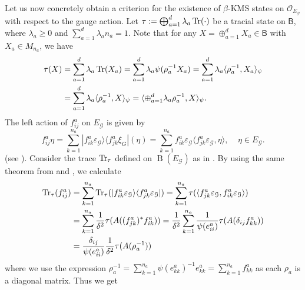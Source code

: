 \documentclass[a4paper,reqno]{amsart}
\numberwithin{equation}{section}
\newtheorem{theorem}{Theorem}
\numberwithin{theorem}{section}
\theoremstyle{definition}\newtheorem{definition}[theorem]{Definition}
\theoremstyle{definition}\newtheorem{remark}[theorem]{Remark}
\theoremstyle{definition}\newtheorem{example}[theorem]{Example}
\theoremstyle{definition}\newtheorem*{notation*}{Notation}
\theoremstyle{definition}\newtheorem*{convention*}{Convention}
\theoremstyle{definition}\newtheorem{observation}{Observation}
\theoremstyle{definition}\newtheorem*{acknowledgment*}{Acknowledgments}
\newcommand{\R}{\mathbb{R}}
\newcommand{\B}{\mathsf{B}}
\newcommand{\G}{\mathcal{G}}
\newcommand{\cst}{C^*}
\renewcommand{\op}[1]{\operatorname{#1}}
\begin{document}



Let us now concretely obtain a criterion for the existence of $\beta$-KMS states on $\mathcal{O}_{E_\G}$ with respect to the gauge action.
Let $\tau:=\bigoplus_{a=1}^d\lambda_a\Tr(\cdot)$ be a tracial state on $\B$, where $\lambda_a\geq0$ and $\sum_{a=1}^d\lambda_a n_a=1$. Note that for any $X=\oplus_{a=1}^{d}X_a\in\B$ with $X_a\in M_{n_a}$, we have
\begin{align*}
    \tau(X)&=\sum_{a=1}^d\lambda_a\Tr(X_a)=\sum_{a=1}^d\lambda_a\psi(\rho_{a}^{-1}X_a)
=\sum_{a=1}^d\lambda_a\langle\rho_{a}^{-1},X_a\rangle_\psi
\\&=\sum_{a=1}^d\lambda_a\langle\rho_a^{-1}, X\rangle_\psi=\langle\oplus_{a=1}^d\lambda_a\rho_a^{-1}, X\rangle_\psi.
\end{align*}
The left action of $f_{ij}^a$ on $E_\G$ is given by
\[f_{ij}^a\eta=\sum_{k=1}^{n_a}|f_{ik}^a\varepsilon_\G\rangle\langle f_{jk}^a\xi_G|(\eta)=\sum_{k=1}^{n_a}f_{ik}^a\varepsilon_\G\langle f_{jk}^a\varepsilon_\G,\eta\rangle,\;\;\;\;\eta\in E_\G.\]
(see \cite[Theorem 2.12]{BHINW}). Consider the trace $\Tr_\tau$ defined on $\op{B}(E_\G)$ as in \cite[Theorem 1.1]{LN}. By using the same theorem from \cite{LN} and \cite[Theorem 2.5]{BHINW}, we calculate
\begin{align*}
    \Tr_\tau(f_{ij}^a)&=\sum_{k=1}^{n_a}\Tr_\tau(|f_{ik}^a\varepsilon_\G\rangle\langle f_{jk}^a\varepsilon_\G|)=\sum_{k=1}^{n_a}\tau(\langle f_{jk}^a\varepsilon_\G, f_{ik}^a\varepsilon_\G\rangle)\\
    &=\sum_{k=1}^{n_a}\frac{1}{\delta^2}\tau(A((f_{jk}^a)^*f_{ik}^a))=\frac{1}{\delta^2}\sum_{k=1}^{n_a}\frac{1}{\psi(e_{ii}^a)}\tau(A(\delta_{ij}f_{kk}^a))\\
    &=\frac{\delta_{ij}}{\psi(e_{ii}^a)}\frac{1}{\delta^2}\tau(A(\rho_a^{-1}))
\end{align*}
where we  use the expression $\rho_a^{-1}=\sum_{k=1}^{n_a}\psi(e_{kk}^a)^{-1}e_{kk}^a=\sum_{k=1}^{n_a}f_{kk}^a$ as each $\rho_a$ is a diagonal matrix. Thus we get
\end{document}
